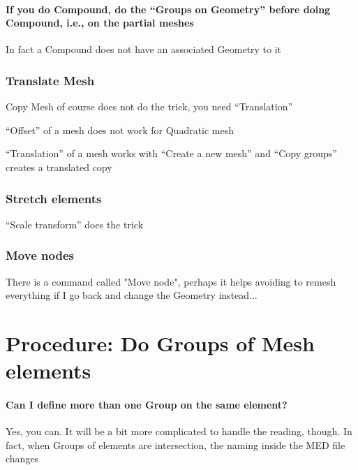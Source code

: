 \documentclass[10pt]{book}
\begin{document}
   
  \subsubsection{If you do Compound, do the ``Groups on Geometry'' before doing Compound, i.e., on the partial meshes}         
 
 
  In fact a Compound does not have an associated Geometry to it
        

   
\subsection{Translate Mesh}

 
 Copy Mesh of course does not do the trick, you need ``Translation''
 
 ``Offset'' of a mesh does not work for Quadratic mesh
 
 ``Translation'' of a mesh works with ``Create a new mesh'' and ``Copy groups'' creates a translated copy


\subsection{Stretch elements}

  ``Scale transform'' does the trick

   
 \subsection{Move nodes}


 There is a command called "Move node", perhaps it helps avoiding to remesh everything if I go back and change the Geometry instead...



  
  
  \chapter{Procedure: Do Groups of Mesh elements}
 

\subsubsection{Can I define more than one Group on the same element?}

 Yes, you can. It will be a bit more complicated to handle the reading, though.
 In fact, when Groups of elements are intersection,
 the naming inside the MED file changes
 
\end{document}
